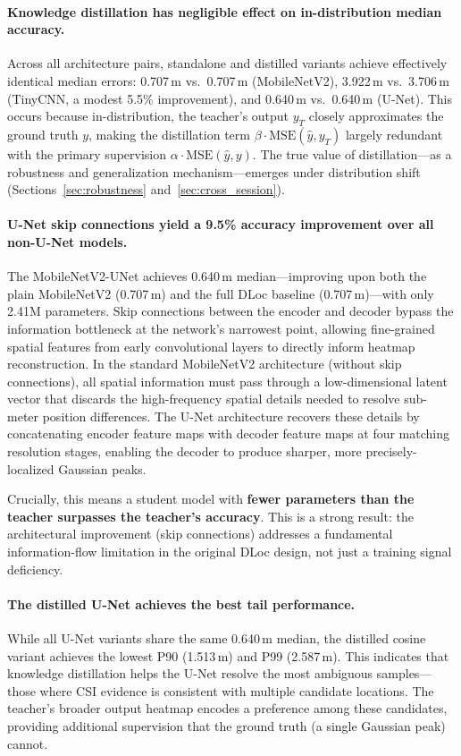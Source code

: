 \documentclass[11pt,a4paper]{article}
\begin{document}
\paragraph{Knowledge distillation has negligible effect on in-distribution median accuracy.}
Across all architecture pairs, standalone and distilled variants achieve effectively identical median errors: 0.707\,m vs.\ 0.707\,m (MobileNetV2), 3.922\,m vs.\ 3.706\,m (TinyCNN, a modest 5.5\% improvement), and 0.640\,m vs.\ 0.640\,m (U-Net).
This occurs because in-distribution, the teacher's output $y_T$ closely approximates the ground truth $y$, making the distillation term $\beta \cdot \text{MSE}(\hat{y}, y_T)$ largely redundant with the primary supervision $\alpha \cdot \text{MSE}(\hat{y}, y)$.
The true value of distillation---as a robustness and generalization mechanism---emerges under distribution shift (Sections~\ref{sec:robustness} and~\ref{sec:cross_session}).

\paragraph{U-Net skip connections yield a 9.5\% accuracy improvement over all non-U-Net models.}
The MobileNetV2-UNet achieves 0.640\,m median---improving upon both the plain MobileNetV2 (0.707\,m) and the full DLoc baseline (0.707\,m)---with only 2.41M parameters.
Skip connections between the encoder and decoder bypass the information bottleneck at the network's narrowest point, allowing fine-grained spatial features from early convolutional layers to directly inform heatmap reconstruction.
In the standard MobileNetV2 architecture (without skip connections), all spatial information must pass through a low-dimensional latent vector that discards the high-frequency spatial details needed to resolve sub-meter position differences.
The U-Net architecture recovers these details by concatenating encoder feature maps with decoder feature maps at four matching resolution stages, enabling the decoder to produce sharper, more precisely-localized Gaussian peaks.

Crucially, this means a student model with \textbf{fewer parameters than the teacher surpasses the teacher's accuracy}.
This is a strong result: the architectural improvement (skip connections) addresses a fundamental information-flow limitation in the original DLoc design, not just a training signal deficiency.

\paragraph{The distilled U-Net achieves the best tail performance.}
While all U-Net variants share the same 0.640\,m median, the distilled cosine variant achieves the lowest P90 (1.513\,m) and P99 (2.587\,m).
This indicates that knowledge distillation helps the U-Net resolve the most ambiguous samples---those where CSI evidence is consistent with multiple candidate locations.
The teacher's broader output heatmap encodes a preference among these candidates, providing additional supervision that the ground truth (a single Gaussian peak) cannot.
\end{document}
